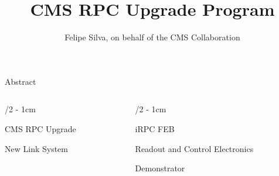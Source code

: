 \documentclass[portrait]{uioposter}
\title{CMS RPC Upgrade Program}
\author
{%
    Felipe Silva, on behalf of the CMS Collaboration
}
\institute
{
   Rio de Janeiro State University - Email: felipe.silva@cern.ch
}
\begin{document}
\begin{frame}


    \begin{block}{Abstract}
        \vskip-1.5cm
        
    \end{block}

\begin{columns}[onlytextwidth]

\begin{column}{\textwidth/2 - 1cm}

    \vskip-2cm
    \begin{block}{CMS RPC Upgrade}
        \vskip-1.5cm
        
    \end{block}

    \vskip-2cm
    \begin{block}{New Link System}
        \vskip-1.5cm
        
    \end{block}
\end{column}


\begin{column}{\textwidth/2 - 1cm}
    \vskip-2cm
    \begin{block}{iRPC FEB}
        \vskip-1.5cm
        
    \end{block}

    \vskip-2cm
    \begin{block}{Readout and Control Electronics}
        \vskip-1.5cm
        
    \end{block}

    \vskip-2cm
    \begin{block}{Demonstrator}
        \vskip-1.5cm
        
    \end{block}


\end{column}






\end{columns}
\end{frame}
\end{document}

